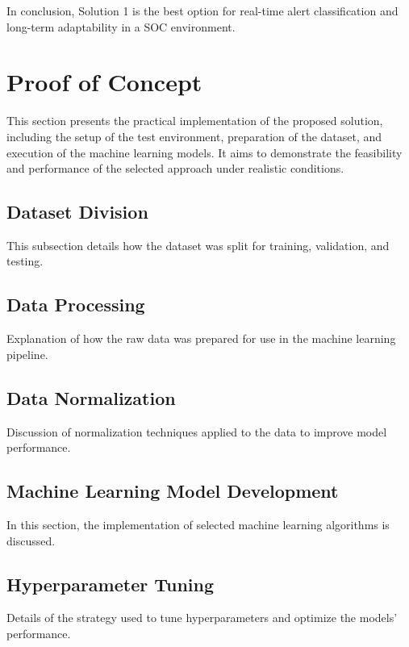 In conclusion, Solution 1 is the best option for real-time alert classification and long-term adaptability in a SOC environment.

\section{Proof of Concept}
This section presents the practical implementation of the proposed solution, including the setup of the test environment, preparation of the dataset, and execution of the machine learning models. It aims to demonstrate the feasibility and performance of the selected approach under realistic conditions.

\subsection{Dataset Division}
This subsection details how the dataset was split for training, validation, and testing.

\subsection{Data Processing}
Explanation of how the raw data was prepared for use in the machine learning pipeline.

\subsection{Data Normalization}
Discussion of normalization techniques applied to the data to improve model performance.

\subsection{Machine Learning Model Development}
In this section, the implementation of selected machine learning algorithms is discussed.

\subsection{Hyperparameter Tuning}
Details of the strategy used to tune hyperparameters and optimize the models' performance.
